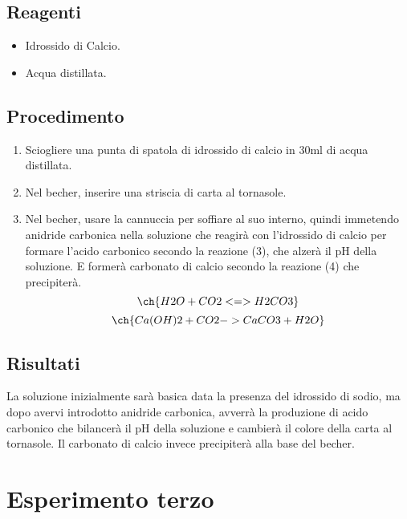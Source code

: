 \documentclass[a4paper,10pt]{article}
\begin{document}
	\subsection{Reagenti}
	\begin{itemize}
		\item Idrossido di Calcio.
		\item Acqua distillata.
	\end{itemize}
	\subsection{Procedimento}
	\begin{enumerate}
		\item Sciogliere una punta di spatola di idrossido di calcio in 30ml di acqua distillata.
		\item Nel becher, inserire una striscia di carta al tornasole.
		\item Nel becher, usare la cannuccia per soffiare al suo interno, quindi immetendo anidride carbonica nella soluzione che reagirà con l'idrossido di calcio per formare l'acido carbonico secondo la reazione (3), che alzerà il pH della soluzione. E formerà carbonato di calcio secondo la reazione (4) che precipiterà.
		\begin{equation}
			\ch{H2O + CO2 <=> H2CO3}
		\end{equation}
		\begin{equation}
			\ch{Ca(OH)2 + CO2 -> CaCO3 + H2O}
		\end{equation}
		
	\end{enumerate}
	\subsection{Risultati}
	La soluzione inizialmente sarà basica data la presenza del idrossido di sodio, ma dopo avervi introdotto anidride carbonica, avverrà la produzione di acido carbonico che bilancerà il pH della soluzione e cambierà il colore della carta al tornasole. Il carbonato di calcio invece precipiterà alla base del becher.
	
	\break
	
	
	
	
	
	
	
	
	
	
	
	\section{Esperimento terzo}
\end{document}
